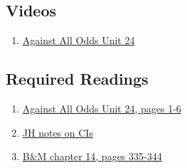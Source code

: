 \documentclass[letterpaper,9pt,twocolumn,twoside,printwatermark=false]{pinp}
\providecommand{\tightlist}{%
  \setlength{\itemsep}{0pt}\setlength{\parskip}{0pt}}
\begin{document}
\subsection{Videos}\label{videos}

\begin{enumerate}
\def\labelenumi{\arabic{enumi}.}
\tightlist
\item
  \href{https://www.learner.org/courses/againstallodds/unitpages/unit24.html}{Against
  All Odds Unit 24}
\end{enumerate}

\subsection{Required Readings}\label{required-readings-1}

\begin{enumerate}
\item \href{https://www.learner.org/courses/againstallodds/pdfs/AgainstAllOdds_StudentGuide_Unit24.pdf#page=1}{Against All Odds Unit 24, pages 1-6}
\item \href{https://www.dropbox.com/s/epgqkz3g0qklcp9/Ch14ConfidenceIntervalsJH2018.pdf?dl=0}{JH notes on CIs}
\item \href{https://www.dropbox.com/s/luzhlatvx9hvwyn/Ch14IntroToInference.pdf?dl=0}{B\&M chapter 14, pages 335-344}
\end{enumerate}





\end{document}
